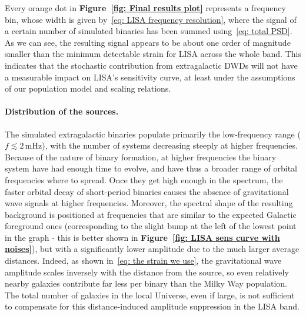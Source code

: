Every orange dot in \textbf{Figure~\ref{fig: Final results plot}} represents a frequency bin, whose width is given by~\eqref{eq: LISA frequency resolution}, where the signal of a certain number of simulated binaries has been summed using~\eqref{eq: total PSD}.
As we can see, the resulting signal appears to be about one order of magnitude smaller than the minimum detectable strain for LISA across the whole band.  
This indicates that the stochastic contribution from extragalactic DWDs will not have a measurable impact on LISA’s sensitivity curve, at least under the assumptions of our population model and scaling relations.

\paragraph{Distribution of the sources.}
The simulated extragalactic binaries populate primarily the low-frequency range ($f \lesssim 2\,\mathrm{mHz}$), with the number of systems decreasing steeply at higher frequencies. 
Because of the nature of binary formation, at higher frequencies the binary system have had enough time to evolve, and have thus a broader range of orbital frequencies where to spread. 
Once they get high enough in the spectrum, the faster orbital decay of short-period binaries causes the absence of gravitational wave signals at higher frequencies.
Moreover, the spectral shape of the resulting background is positioned at frequencies that are similar to the expected Galactic foreground ones (corresponding to the slight bump at the left of the lowest point in the graph - this is better shown in \textbf{Figure~\ref{fig: LISA sens curve with noises}}), but with a significantly lower amplitude due to the much larger average distances.
Indeed, as shown in~\eqref{eq: the strain we use}, the gravitational wave amplitude scales inversely with the distance from the source, so even relatively nearby galaxies contribute far less per binary than the Milky Way population. 
The total number of galaxies in the local Universe, even if large, is not sufficient to compensate for this distance-induced amplitude suppression in the LISA band.
